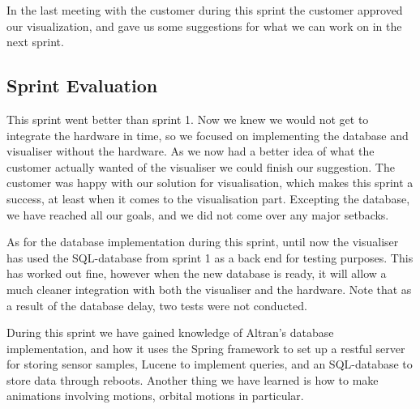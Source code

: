 \documentclass[../document]{subfiles}
\begin{document}
In the last meeting with the customer during this sprint the customer approved our visualization, and gave us some suggestions for what we can work on in the next sprint.  

\subsection{Sprint Evaluation}
This sprint went better than sprint 1. Now we knew we would not get to integrate the hardware in time, so we focused on implementing the database and visualiser without the hardware. As we now had a better idea of what the customer actually wanted of the visualiser we could finish our suggestion. The customer was happy with our solution for visualisation, which makes this sprint a success, at least when it comes to the visualisation part. Excepting the database, we have reached all our goals, and we did not come over any major setbacks.

As for the database implementation during this sprint, until now the visualiser has used the \gls{SQL}-database from sprint 1 as a back end for testing purposes. This has worked out fine, however when the new database is ready, it will allow a much cleaner integration with both the visualiser and the hardware. Note that as a result of the database delay, two tests were not conducted.

During this sprint we have gained knowledge of Altran’s database implementation, and how it uses the Spring framework to set up a restful server for storing sensor samples, Lucene to implement queries, and an \gls{SQL}-database to store data through reboots. Another thing we have learned is how to make animations involving motions, orbital motions in particular.
\end{document}
